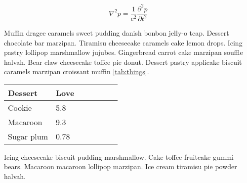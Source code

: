 \begin{equation}
\nabla^2p = \frac{1}{c^2} \frac{\partial^2 p}{\partial t^2}
\label{eq:wave}
\end{equation}

Muffin dragee caramels sweet pudding danish bonbon jelly-o \gls{tcap}. 
Dessert chocolate bar marzipan. 
Tiramisu cheesecake caramels cake lemon drops. Icing pastry lollipop marshmallow jujubes.
Gingerbread carrot cake marzipan souffle halvah. Bear claw cheesecake toffee pie donut. 
Dessert pastry applicake biscuit caramels marzipan croissant muffin \ref{tab:things}.

\begin{table*}[h]
\begin{center}
\caption{Halvah danish liquorice sesame snaps}
\begin{tabular}{l l l l l l l}
Dessert & Love \\
\hline
Cookie & 5.8\\
Macaroon & 9.3\\
Sugar plum & 0.78\\
\hline
\end{tabular}
\label{tab:things}
\end{center}
\end{table*}


\noindent 
Icing cheesecake biscuit pudding marshmallow. 
Cake toffee fruitcake gummi bears. 
Macaroon macaroon lollipop marzipan. 
Ice cream tiramisu pie powder halvah.







